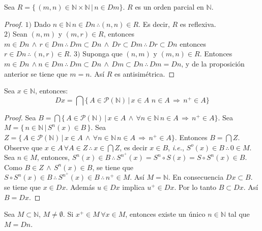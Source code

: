 \begin{proposition}\label{prop:22} Sea $R= \{\, (m,n)\in \mathbb{N}\times \mathbb{N} \, | \, n
    \in Dm\}$. $R$ es un orden parcial en $\mathbb{N}$.
\end{proposition}
\begin{proof}
    $1)$ Dado $n \in \mathbb{N} \, n \in Dn\, \therefore (n,n)\in R$. Es decir, $R$
    es reflexiva. \\
    $2)$ Sean $(n,m)$ y $(m,r)\in R$, entonces $m \in Dn \, \land \, r \in Dm\,
    \therefore \, Dm \subset Dn \, \land \, Dr \subset Dm \, \therefore \, Dr
    \subset Dn$ entonces $r \in Dn \, \therefore \, (n,r) \in R$.
    $3)$ Suponga que $(n,m)$ y $(m,n)\in R$. Entonces $m \in Dn \, \land n \in Dm
    \, \therefore \, Dm \subset Dn \, \land \, Dm \subset Dn \, \therefore \, Dm =
    Dn$, y de la proposición anterior se tiene que $m=n$. Así $R$ es antisimétrica.
\end{proof}
\begin{lemma} 
    Sea $x\in \mathbb{N}$, entonces:
    \[
        Dx = \bigcap \{\, A \in \mathcal{P}(\mathbb{N})\, | \, x \in A \, \, n
        \in A \,\Rightarrow \, n^+ \in A\}
    \]
\end{lemma}
\begin{proof}
    Sea $B = \bigcap\{ \, A \in \mathcal{P}(\mathbb{N}) \, | \, x \in A \,\land \,
    \forall n \in \mathbb{N} \, n \in A \, \Rightarrow \, n^+ \in A \}$. Sea $M
    = \{\, n \in \mathbb{N} \, | \, S^n(x) \in B\,\}$. Sea $Z =\{ \, A \in \mathcal{P}(\mathbb{N}) \, | \, x \in A \,\land \,
    \forall n \in \mathbb{N} \, n \in A \, \Rightarrow \, n^+ \in A \}$.
    Entonces $B = \bigcap Z$. Observe que $x \in A \, \forall A \in Z \,
    \therefore \, x \in \bigcap Z $, es decir $x \in B$, \textit{i.e.}, $ S^o(x) \in B \,
    \therefore \, 0 \in M$. \\
    Sea $n \in M$, entonces, $ S^n(x) \in B \, \therefore \, S^n^+(x) = S^n\circ
    S(x) = S \circ S^n(x) \in B$. Como $B \in Z \, \land \, S^n(x) \in B$, se
    tiene que $S\circ S^n(x) \in B \, \therefore \, S^n^+(x) \in B \, \therefore
    \, n^+ \in M$. Así $M=\mathbb{N}$. En consecuencia $Dx \subset B$. \\
    se tiene que $x \in Dx$. Además $u \in Dx$ implica $u^+ \in Dx$. Por lo
    tanto $B \subset Dx$. Así $B = Dx$.
\end{proof}
\begin{proposition}\label{prop:23}
    Sea $M \subset \mathbb{N}$, $M \neq \emptyset$. Si $x^+ \in M \, \forall x \in M$,
    entonces existe un único $n \in \mathbb{N}$ tal que $M=Dn$.
\end{proposition}
